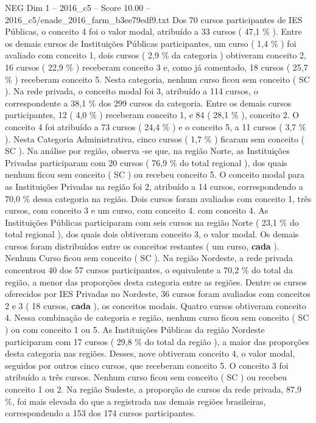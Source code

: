 \begin{textsample}{NEG Dim 1 – 2016\_c5 – Score 10.00 – 2016\_c5/enade\_2016\_farm\_b3ee79edf9.txt}
Dos 70 cursos participantes de IES Públicas, o conceito 4 foi o valor modal, atribuído a 33 cursos ( 47,1 \% ).
Entre os demais cursos de Instituições Públicas participantes, um curso ( 1,4 \% ) foi avaliado com conceito 1, dois cursos ( 2,9 \% da categoria ) obtiveram conceito 2, 16 cursos ( 22,9 \% ) receberam conceito 3 e, como já comentado, 18 cursos ( 25,7 \% ) receberam conceito 5.
Nesta categoria, nenhum curso ficou sem conceito ( SC ).
Na rede privada, o conceito modal foi 3, atribuído a 114 cursos, o correspondente a 38,1 \% dos 299 cursos da categoria.
Entre os demais cursos participantes, 12 ( 4,0 \% ) receberam conceito 1, e 84 ( 28,1 \% ), conceito 2.
O conceito 4 foi atribuído a 73 cursos ( 24,4 \% ) e o conceito 5, a 11 cursos ( 3,7 \% ).
Nesta Categoria Administrativa, cinco cursos ( 1,7 \% ) ficaram sem conceito ( SC ).
Na análise por região, observa -se que, na região Norte, as Instituições Privadas participaram com 20 cursos ( 76,9 \% do total regional ), dos quais nenhum ficou sem conceito ( SC ) ou recebeu conceito 5.
O conceito modal para as Instituições Privadas na região foi 2, atribuído a 14 cursos, correspondendo a 70,0 \% dessa categoria na região.
Dois cursos foram avaliados com conceito 1, três cursos, com conceito 3 e um curso, com conceito 4. com conceito 4.
As Instituições Públicas participaram com seis cursos na região Norte ( 23,1 \% do total regional ), dos quais dois obtiveram conceito 3, o valor modal.
Os demais cursos foram distribuídos entre os conceitos restantes ( um curso, \textbf{cada} ).
Nenhum Curso ficou sem conceito ( SC ).
Na região Nordeste, a rede privada concentrou 40 dos 57 cursos participantes, o equivalente a 70,2 \% do total da região, a menor das proporções desta categoria entre as regiões.
Dentre os cursos oferecidos por IES Privadas no Nordeste, 36 cursos foram avaliados com conceitos 2 e 3 ( 18 cursos, \textbf{cada} ), os conceitos modais.
Quatro cursos obtiveram conceito 4.
Nessa combinação de categoria e região, nenhum curso ficou sem conceito ( SC ) ou com conceito 1 ou 5.
As Instituições Públicas da região Nordeste participaram com 17 cursos ( 29,8 \% do total da região ), a maior das proporções desta categoria nas regiões.
Desses, nove obtiveram conceito 4, o valor modal, seguidos por outros cinco cursos, que receberam conceito 5.
O conceito 3 foi atribuído a três cursos.
Nenhum curso ficou sem conceito ( SC ) ou recebeu conceito 1 ou 2.
Na região Sudeste, a proporção de cursos da rede privada, 87,9 \%, foi mais elevada do que a registrada nas demais regiões brasileiras, correspondendo a 153 dos 174 cursos participantes.

\end{textsample}
